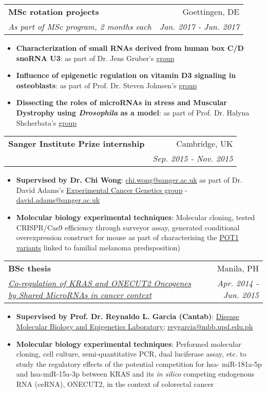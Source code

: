 \documentclass[legalpaper,11pt]{article}
\makeatletter
\newcommand{\resumeItem}[2]{
  \item\small{
    \textbf{#1}{: #2 \vspace{-2pt}}
  }
}
\newcommand{\resumeSubheading}[4]{
  \vspace{-1pt}\item
    \begin{tabular*}{0.97\textwidth}[t]{l@{\extracolsep{\fill}}r}
      \textbf{#1} & #2 \\
      \textit{\small#3} & \textit{\small #4} \\
    \end{tabular*}\vspace{-5pt}
}
\newcommand{\resumeItemListStart}{\begin{itemize}}
\newcommand{\resumeItemListEnd}{\end{itemize}\vspace{-5pt}}
\makeatother
\begin{document}
     \resumeSubheading
      {MSc rotation projects}{Goettingen, DE}
      {As part of MSc program, 2 months each}{Jan. 2017 - Jun. 2017}
      \resumeItemListStart
        \resumeItem{Characterization of small RNAs derived from human box C/D snoRNA U3}{as part of Dr. Jens Gruber's \href{https://bio-protocol.org/UserHome.aspx?id=1032127}{group}}
        \resumeItem{Influence of epigenetic regulation on vitamin D3 signaling in osteoblasts}{as part of Prof. Dr. Steven Johnsen's \href{https://johnsenlab.wordpress.com/}{group}}
        \resumeItem{Dissecting the roles of microRNAs in stress and Muscular Dystrophy using \textit{Drosophila} as a model}{as part of Prof. Dr. Halyna Shcherbata's \href{https://shcherbatalab.wordpress.com/}{group}}
     \resumeItemListEnd

     \resumeSubheading
      {Sanger Institute Prize internship}{Cambridge, UK}
      {}{Sep. 2015 - Nov. 2015}
      \resumeItemListStart
        \resumeItem{Supervised by Dr. Chi Wong}{\href{mailto: chi.wong@sanger.ac.uk}{chi.wong@sanger.ac.uk} as part of Dr. David Adams's \href{https://www.sanger.ac.uk/group/adams-group/}{Experimental Cancer Genetics group} - \href{mailto:david.adams@sanger.ac.uk}{david.adams@sanger.ac.uk}}
        \resumeItem{Molecular biology experimental techniques}
          {Molecular cloning, tested CRISPR/Cas9 efficiency through surveyor assay, generated conditional overexpression construct for mouse as part of characterising the \href{https://www.nature.com/articles/ng.2947}{POT1 variants} linked to familial melanoma predisposition)}
     \resumeItemListEnd
     
     \resumeSubheading
      {BSc thesis}{Manila, PH}{\href{https://www.researchgate.net/publication/343770282_Co-Regulation_of_KRAS_and_its_Putative_ceRNAs_KRASP1_ZNF148_and_ONECUT2_in_Colorectal_Cancer}{Co-regulation of KRAS and ONECUT2 Oncogenes by Shared MicroRNAs in cancer context}}{Apr. 2014 - Jun. 2015}
      \resumeItemListStart
        \resumeItem{Supervised by Prof. Dr. Reynaldo L. Garcia (Cantab)}{\href{https://www.dmbel-nimbb.com/home}{Disease Molecular Biology and Epigenetics Laboratory}; \href{mailto:reygarcia@mbb.upd.edu.ph}{reygarcia@mbb.upd.edu.ph}}
        \resumeItem{Molecular biology experimental techniques}
          {Performed molecular cloning, cell culture, semi-quantitative PCR, dual luciferase assay, etc. to study the regulatory effects of the potential competition for hsa- miR-181a-5p and hsa-miR-15a-3p between KRAS and its \textit{in silico} competing endogenous RNA (ceRNA), ONECUT2, in the context of colorectal cancer}
     \resumeItemListEnd
\end{document}
